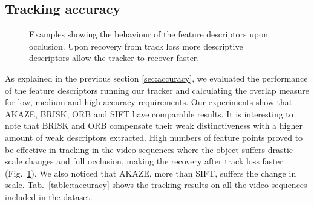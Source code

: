 \subsection{Tracking accuracy}

\begin{figure}[t]
	\vspace{2mm}
\centerline{%
	}
\caption{Examples showing the behaviour of the feature descriptors upon occlusion. Upon recovery from track loss more descriptive descriptors allow the tracker to recover faster.}
\vspace{-3mm}
\label{fig:tracking_results}
\end{figure}


As explained in the previous section \ref{sec:accuracy}, we evaluated the performance of the feature descriptors running our tracker and calculating the overlap measure for low, medium and high accuracy requirements. Our experiments show that AKAZE, BRISK, ORB and SIFT have comparable results. It is interesting to note that BRISK and ORB compensate their weak distinctiveness with a higher amount of weak descriptors extracted. High numbers of feature points proved to be effective in tracking in the video sequences where the object suffers drastic scale changes and full occlusion, making the recovery after track loss faster (Fig.~\ref{fig:tracking_results}). We also noticed that AKAZE, more than SIFT, suffers the change in scale. Tab.~\ref{table:taccuracy} shows the tracking results on all the video sequences included in the dataset.  



